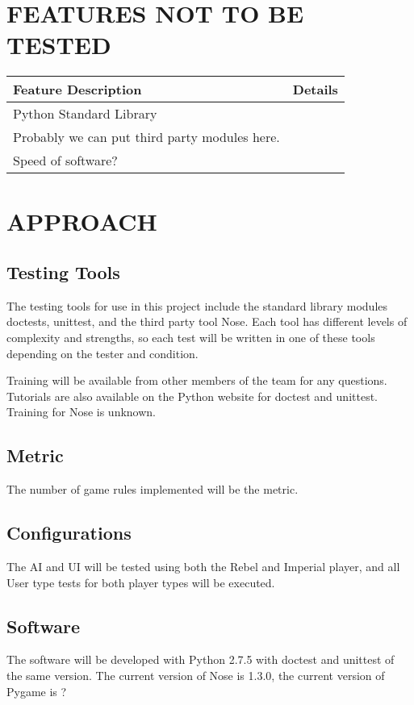 \documentclass[report]{article}
\begin{document}
\section[FEATURES NOT TO BE TESTED]{FEATURES NOT TO BE TESTED}
\begin{center}
\begin{tabularx}{\textwidth}{| X | X |}
  \hline
  \textbf{Feature Description} &
    \textbf{Details} 
\\ \hline
 Python Standard Library
 \\ \hline
 Probably we can put third party modules here.
 \\ \hline
 Speed of software?
\\ \hline



\end{tabularx}
\end{center}


\section[APPROACH]{APPROACH}
\subsection{Testing Tools}
The testing tools for use in this project include the standard library modules doctests, unittest, and the third party tool Nose. Each tool has different levels of complexity and strengths, so each test will be written in one of these tools depending on the tester and condition.

Training will be available from other members of the team for any questions. Tutorials are also available on the Python website for doctest and unittest. Training for Nose is unknown.

\subsection{Metric}
The number of game rules implemented will be the metric.

\subsection{Configurations}
The AI and UI will be tested using both the Rebel and Imperial player, and all User type tests for both player types will be executed.

\subsection{Software}
The software will be developed with Python 2.7.5 with doctest and unittest of the same version. The current version of Nose is 1.3.0, the current version of Pygame is ?
\end{document}
